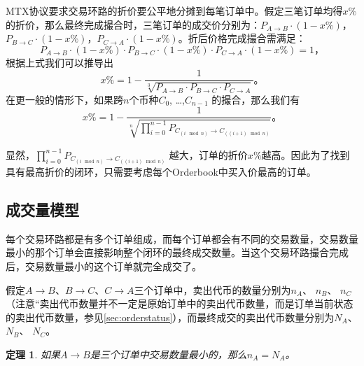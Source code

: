 \documentclass[UTF8,nofonts]{ctexart}
\newtheorem{theorem}{定理}[section]
\begin{document}
MTX协议要求交易环路的折价要公平地分摊到每笔订单中。假定三笔订单均得$x\%$的折价，那么最终完成撮合时，三笔订单的成交价分别为：$P_{A \rightarrow B}\cdot (1-x\%)$，$P_{B \rightarrow C}\cdot (1-x\%)$，$P_{C \rightarrow A}\cdot (1-x\%)$。折后价格完成撮合需满足：
\begin{equation}\label{match}
P_{A \rightarrow B}\cdot (1-x\%)\cdot P_{B \rightarrow C}\cdot (1-x\%)\cdot P_{C \rightarrow A}\cdot (1-x\%) = 1\text{，}
\end{equation}
根据上式我们可以推导出
\begin{equation*}
x\%= 1- \frac{1}{\sqrt[3]{P_{A \rightarrow B}\cdot P_{B \rightarrow C}\cdot P_{C \rightarrow A}}}\text{。}
\end{equation*}
在更一般的情形下，如果跨$n$个币种$C_{0}$, …,$C_{n-1}$ 的撮合，那么我们有
\begin{equation*}
x\%= 1- \frac{1}{\sqrt[n]{\prod_{i=0}^{n-1} P_{C_{(i\mod n)} \rightarrow C_{((i+1)\mod n)}}}}\text{。}
\end{equation*}

显然，$\prod_{i=0}^{n-1} P_{C_{(i\mod n)} \rightarrow C_{((i+1)\mod n)}}$ 越大，订单的折价$x\%$越高。因此为了找到具有最高折价的闭环，只需要考虑每个Orderbook中买入价最高的订单。


\subsection{成交量模型}
每个交易环路都是有多个订单组成，而每个订单都会有不同的交易数量，交易数量最小的那个订单会直接影响整个闭环的最终成交数量。当这个交易环路撮合完成后，交易数量最小的这个订单就完全成交了。

假定$A \rightarrow B$、$B \rightarrow C$、$C \rightarrow A$三个订单中，卖出代币的数量分别为$n_{A}$、 $n_{B}$、 $n_{C}$（注意“卖出代币数量并不一定是原始订单中的卖出代币数量，而是订单当前状态的卖出代币数量，参见\ref{sec:orderstatus}），而最终成交的卖出代币数量分别为$N_{A}$、 $N_{B}$、 $N_{C}$。

\begin{theorem}
如果$A \rightarrow B$是三个订单中交易数量最小的，那么$n_{A} = N_{A}$。
\end{theorem}
\end{document}
